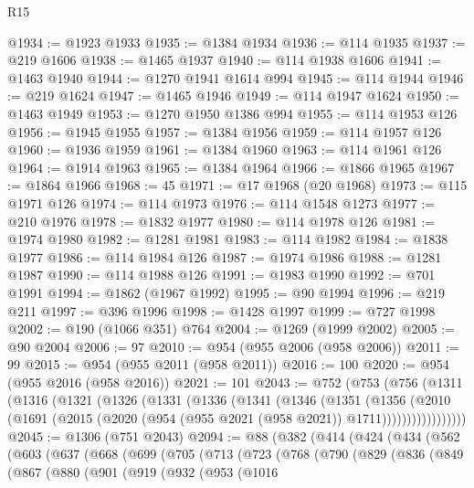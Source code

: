 \begin{lexlean}{R15}
\begin{coremodule}
@1934 := @1923 @1933
@1935 := @1384 @1934
@1936 := @114 @1935
@1937 := @219 @1606
@1938 := @1465 @1937
@1940 := @114 @1938 @1606
@1941 := @1463 @1940
@1944 := @1270 @1941 @1614 @994
@1945 := @114 @1944
@1946 := @219 @1624
@1947 := @1465 @1946
@1949 := @114 @1947 @1624
@1950 := @1463 @1949
@1953 := @1270 @1950 @1386 @994
@1955 := @114 @1953 @126
@1956 := @1945 @1955
@1957 := @1384 @1956
@1959 := @114 @1957 @126
@1960 := @1936 @1959
@1961 := @1384 @1960
@1963 := @114 @1961 @126
@1964 := @1914 @1963
@1965 := @1384 @1964
@1966 := @1866 @1965
@1967 := @1864 @1966
@1968 := 45
@1971 := @17 @1968 (@20 @1968)
@1973 := @115 @1971 @126
@1974 := @114 @1973
@1976 := @114 @1548 @1273
@1977 := @210 @1976
@1978 := @1832 @1977
@1980 := @114 @1978 @126
@1981 := @1974 @1980
@1982 := @1281 @1981
@1983 := @114 @1982
@1984 := @1838 @1977
@1986 := @114 @1984 @126
@1987 := @1974 @1986
@1988 := @1281 @1987
@1990 := @114 @1988 @126
@1991 := @1983 @1990
@1992 := @701 @1991
@1994 := @1862 (@1967 @1992)
@1995 := @90 @1994
@1996 := @219 @211
@1997 := @396 @1996
@1998 := @1428 @1997
@1999 := @727 @1998
@2002 := @190 (@1066 @351) @764
@2004 := @1269 (@1999 @2002)
@2005 := @90 @2004
@2006 := 97
@2010 := @954 (@955 @2006 (@958 @2006))
@2011 := 99
@2015 := @954 (@955 @2011 (@958 @2011))
@2016 := 100
@2020 := @954 (@955 @2016 (@958 @2016))
@2021 := 101
@2043 := @752
    (@753
      (@756
        (@1311
          (@1316
            (@1321
              (@1326
                (@1331
                  (@1336
                    (@1341
                      (@1346
                        (@1351
                          (@1356
                            (@2010
                              (@1691
                                (@2015 (@2020 (@954 (@955 @2021 (@958 @2021)) @1711)))))))))))))))))
@2045 := @1306 (@751 @2043)
@2094 := @88
    (@382
      (@414
        (@424
          (@434
            (@562
              (@603
                (@637
                  (@668
                    (@699
                      (@705
                        (@713
                          (@723
                            (@768
                              (@790
                                (@829
                                  (@836
                                    (@849
                                      (@867
                                        (@880
                                          (@901
                                            (@919
                                              (@932
                                                (@953
                                                  (@1016

\end{coremodule}
\end{lexlean}
